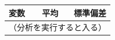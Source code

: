 \begin{tabular}{lrr}
\toprule
\textbf{変数} & \textbf{平均} & \textbf{標準偏差} \\
\midrule
\multicolumn{3}{c}{（分析を実行すると入る）} \\
\bottomrule
\end{tabular}
